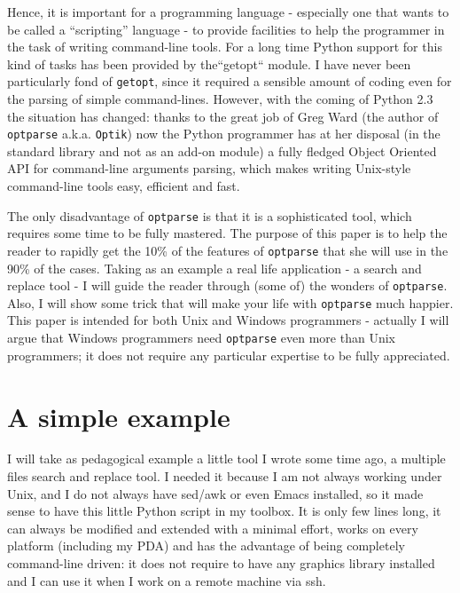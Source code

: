 \documentclass[10pt,a4paper,english]{article}
\begin{document}
Hence, it is important for a programming language - especially
one that wants to be called a ``scripting'' language - to provide 
facilities to help the programmer in the task of writing command-line 
tools. For a long time Python support for this kind of tasks has 
been provided by the``getopt`` module. I have never 
been particularly fond of \texttt{getopt}, since it required 
a sensible amount of coding even for the parsing of simple 
command-lines. However, with the coming of Python 2.3 the situation 
has changed: thanks to the great job of Greg Ward (the author of 
\texttt{optparse} a.k.a. \texttt{Optik}) now the Python programmer 
has at her disposal (in the standard library and not as an 
add-on module) a fully fledged Object Oriented API for 
command-line arguments parsing, which makes writing Unix-style 
command-line tools easy, efficient and fast.

The only disadvantage of \texttt{optparse} is that it is a 
sophisticated tool, which requires some time to be fully mastered. 
The purpose of this paper is to help the reader to rapidly get the 
10{\%} of the features of \texttt{optparse} that she will use in the 90{\%} of 
the cases. Taking as an example a real life application - a search and 
replace tool -  I will guide the reader through (some of) the wonders 
of \texttt{optparse}. Also, I will show some trick that will make your life 
with \texttt{optparse} much happier. 
This paper is intended for both Unix and
Windows programmers - actually I will argue that Windows programmers 
need \texttt{optparse} even more than Unix programmers; it does not
require any particular expertise to be fully appreciated.



\hypertarget{a-simple-example}{}
\section*{A simple example}

I will take as pedagogical example a little tool I wrote some time ago,
a multiple files search and replace tool. I needed it because I am 
not always working under Unix, and I do not always have sed/awk or
even Emacs installed, so it made sense to have this 
little Python script in my toolbox. It is only few lines long,
it can always be modified and extended with a minimal effort,
works on every platform (including my PDA) and has the advantage 
of being completely command-line driven: 
it does not require to have any graphics library installed
and I can use it when I work on a remote machine via ssh.
\end{document}
